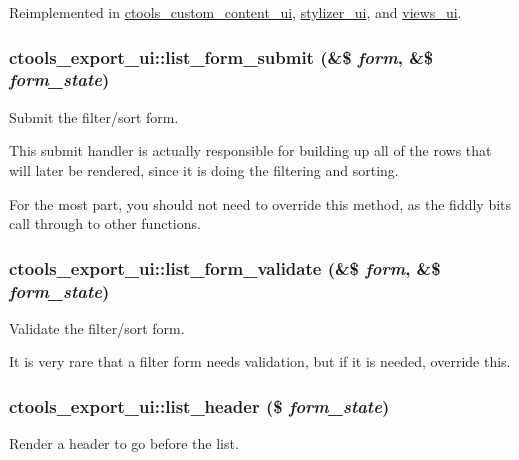 Reimplemented in \hyperlink{classctools__custom__content__ui_a530636bea39fd3a90e7ffca2760643ec}{ctools\_\-custom\_\-content\_\-ui}, \hyperlink{classstylizer__ui_a9a8b030c4fb9ad963152c8381a76b075}{stylizer\_\-ui}, and \hyperlink{classviews__ui_a9f2606bd8902df2f4b1fe3a9a55c9906}{views\_\-ui}.\hypertarget{classctools__export__ui_a292ee9ad95b3e693266bdb0766dda733}{
\subsubsection[{list\_\-form\_\-submit}]{\setlength{\rightskip}{0pt plus 5cm}ctools\_\-export\_\-ui::list\_\-form\_\-submit (\&\$ {\em form}, \/  \&\$ {\em form\_\-state})}}
\label{classctools__export__ui_a292ee9ad95b3e693266bdb0766dda733}
Submit the filter/sort form.

This submit handler is actually responsible for building up all of the rows that will later be rendered, since it is doing the filtering and sorting.

For the most part, you should not need to override this method, as the fiddly bits call through to other functions. \hypertarget{classctools__export__ui_a81aa45747a851effe95011e74d32b9dd}{
\subsubsection[{list\_\-form\_\-validate}]{\setlength{\rightskip}{0pt plus 5cm}ctools\_\-export\_\-ui::list\_\-form\_\-validate (\&\$ {\em form}, \/  \&\$ {\em form\_\-state})}}
\label{classctools__export__ui_a81aa45747a851effe95011e74d32b9dd}
Validate the filter/sort form.

It is very rare that a filter form needs validation, but if it is needed, override this. \hypertarget{classctools__export__ui_a08067ac459551d06772d81673801f023}{
\subsubsection[{list\_\-header}]{\setlength{\rightskip}{0pt plus 5cm}ctools\_\-export\_\-ui::list\_\-header (\$ {\em form\_\-state})}}
\label{classctools__export__ui_a08067ac459551d06772d81673801f023}
Render a header to go before the list.

